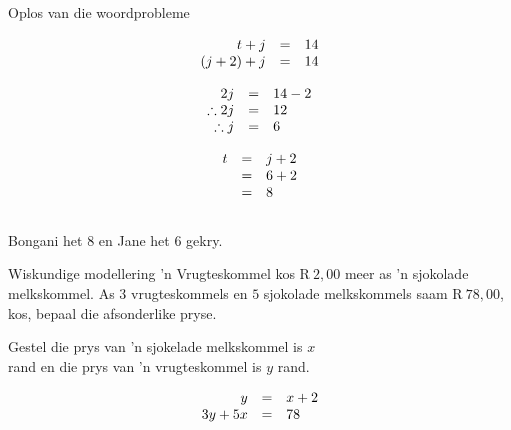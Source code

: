 \begin{aktiwiteit}{}
\begin{wex}{Oplos van die woordprobleme}
{
\begin{equation*}
    \begin{array}{ccc}\hfill t+j& =& 14\hfill \\
	\hfill (j+2)+j& =& 14\hfill \\

    \end{array}
\end{equation*}

\begin{equation*}
    \begin{array}{ccl}\hfill 2j& =& 14 - 2\hfill \\
	\hfill \therefore 2j& =& 12\hfill \\
\hfill \therefore j &=& 6 \hfill

    \end{array}
\end{equation*}

\begin{equation*}
\begin{array}{ccl}\hfill t& =& j+2\hfill \\ & =& 6+2\hfill \\ & =& 8\hfill \end{array}
\end{equation*}
\\
Bongani het $8$ en Jane het  $6$ gekry.\\
}
\end{wex}

\begin{wex}
{Wiskundige modellering}
{
’n
Vrugteskommel kos R$~2,00$ meer as ’n sjokolade melkskommel. As $3$ vrugteskommels en $5$ sjokolade melkskommels saam  R$~78,00$, kos,
bepaal die afsonderlike pryse.}

{
Gestel die prys van ’n sjokelade melkskommel is $x$ 
\\ rand en die prys van ’n vrugteskommel is  $y$ rand.


\begin{equation*}
\begin{array}{ccl} \hfill y &=& x+2 \hfill \\
\hfill 3y+5x& =& 78\hfill 
\end{array}
\end{equation*}

}
\end{wex}
\end{aktiwiteit}

